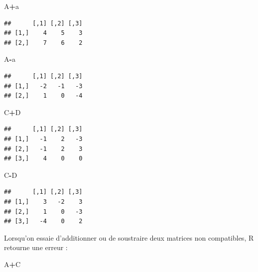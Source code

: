 \documentclass[
  11pt,
]{book}
\newenvironment{Shaded}{\begin{snugshade}}{\end{snugshade}}
\newcommand{\NormalTok}[1]{#1}
\newcommand{\SpecialCharTok}[1]{\textcolor[rgb]{0.81,0.36,0.00}{\textbf{#1}}}
\numberwithin{equation}{section}
\numberwithin{countremarque}{section}
\begin{document}
\begin{Shaded}
\begin{Highlighting}[]
\NormalTok{A}\SpecialCharTok{+}\NormalTok{a}
\end{Highlighting}
\end{Shaded}

\begin{lstlisting}
##      [,1] [,2] [,3]
## [1,]    4    5    3
## [2,]    7    6    2
\end{lstlisting}

\begin{Shaded}
\begin{Highlighting}[]
\NormalTok{A}\SpecialCharTok{{-}}\NormalTok{a}
\end{Highlighting}
\end{Shaded}

\begin{lstlisting}
##      [,1] [,2] [,3]
## [1,]   -2   -1   -3
## [2,]    1    0   -4
\end{lstlisting}

\begin{Shaded}
\begin{Highlighting}[]
\NormalTok{C}\SpecialCharTok{+}\NormalTok{D}
\end{Highlighting}
\end{Shaded}

\begin{lstlisting}
##      [,1] [,2] [,3]
## [1,]   -1    2   -3
## [2,]   -1    2    3
## [3,]    4    0    0
\end{lstlisting}

\begin{Shaded}
\begin{Highlighting}[]
\NormalTok{C}\SpecialCharTok{{-}}\NormalTok{D}
\end{Highlighting}
\end{Shaded}

\begin{lstlisting}
##      [,1] [,2] [,3]
## [1,]    3   -2    3
## [2,]    1    0   -3
## [3,]   -4    0    2
\end{lstlisting}

Lorsqu'on essaie d'additionner ou de soustraire deux matrices non compatibles, R retourne une erreur :

\begin{Shaded}
\begin{Highlighting}[]
\NormalTok{A}\SpecialCharTok{+}\NormalTok{C}
\end{Highlighting}
\end{Shaded}
\end{document}

